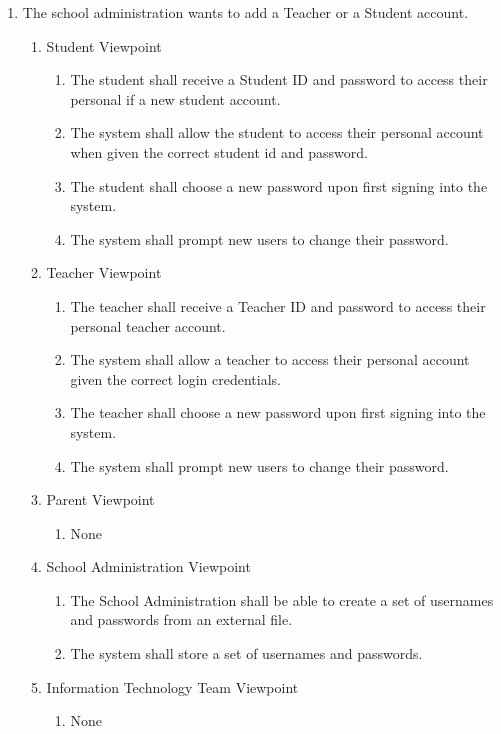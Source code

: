 \documentclass[]{article}
\begin{document}
\begin{enumerate}[{BE}1.]
	\item The school administration wants to add a Teacher or a Student account.
	\begin{enumerate}[{VP1}.1]
		\item Student Viewpoint
			\begin{enumerate}
				\item The student shall receive a Student ID and password to access their
personal if a new student account.
				\item The system shall allow the student to access their personal account when given the correct student id and password.
				\item The student shall choose a new password upon first signing into the
system.
				\item The system shall prompt new users to change their password.
			\end{enumerate}
		\item Teacher Viewpoint
			\begin{enumerate}
				\item The teacher shall receive a Teacher ID and password to access their
personal teacher account.
				\item The system shall allow a teacher to access their personal account given the correct login credentials.
				\item The teacher shall choose a new password upon first signing into the
system.
				\item The system shall prompt new users to change their password.
			\end{enumerate}
		\item Parent Viewpoint
			\begin{enumerate}
				\item None
			\end{enumerate}
		\item School Administration Viewpoint
			\begin{enumerate}
				\item The School Administration shall be able to create a set of usernames
and passwords from an external file.
				\item The system shall store a set of usernames and passwords.
			\end{enumerate}
		\item Information Technology Team Viewpoint
			\begin{enumerate}
				\item None
			\end{enumerate}

\end{enumerate}
\end{enumerate}
\end{document}
